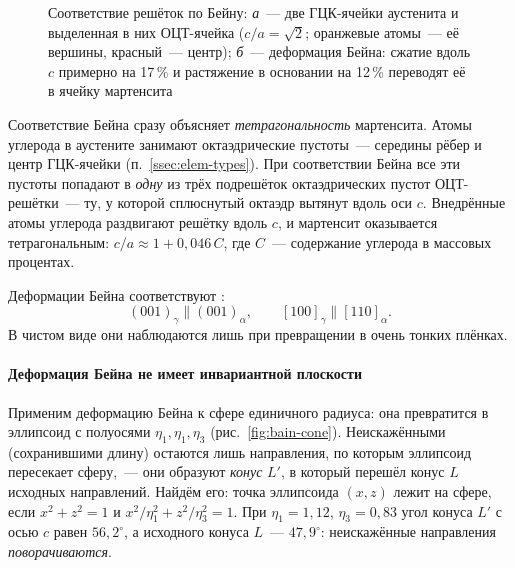 \begin{figure}[ht]
\caption{Соответствие решёток по Бейну: \textit{а}~— две ГЦК-ячейки
аустенита и выделенная в них ОЦТ-ячейка ($c/a=\sqrt2$; оранжевые атомы~—
её вершины, красный~— центр); \textit{б}~— деформация Бейна: сжатие вдоль
$c$ примерно на 17\,\% и растяжение в основании на 12\,\% переводят её в
ячейку мартенсита}
\label{fig:bain}
\end{figure}

Соответствие Бейна сразу объясняет \emph{тетрагональность} мартенсита.
Атомы углерода в аустените занимают октаэдрические пустоты~— середины
рёбер и центр ГЦК-ячейки (п.~\ref{ssec:elem-types}). При соответствии
Бейна все эти пустоты попадают в \emph{одну} из трёх подрешёток
октаэдрических пустот ОЦТ-решётки~— ту, у которой сплюснутый октаэдр
вытянут вдоль оси $c$. Внедрённые атомы углерода раздвигают решётку вдоль
$c$, и мартенсит оказывается тетрагональным:
$c/a\approx1+0{,}046\,C$, где $C$~— содержание углерода в массовых
процентах.

Деформации Бейна соответствуют :
\[
(001)_\gamma\parallel(001)_\alpha,\qquad [100]_\gamma\parallel[110]_\alpha .
\]
В чистом виде они наблюдаются лишь при превращении в очень тонких плёнках.

\paragraph{Деформация Бейна не имеет инвариантной плоскости}
Применим деформацию Бейна к сфере единичного радиуса: она превратится в
эллипсоид с полуосями $\eta_1,\eta_1,\eta_3$ (рис.~\ref{fig:bain-cone}).
Неискажёнными (сохранившими длину) остаются лишь направления, по которым
эллипсоид пересекает сферу,~— они образуют \emph{конус} $L'$, в который
перешёл конус $L$ исходных направлений. Найдём его: точка эллипсоида
$(x,z)$ лежит на сфере, если $x^2+z^2=1$ и
$x^2/\eta_1^2+z^2/\eta_3^2=1$. При $\eta_1=1{,}12$, $\eta_3=0{,}83$
угол конуса $L'$ с осью $c$ равен $56{,}2^\circ$, а исходного конуса $L$~—
$47{,}9^\circ$: неискажённые направления \emph{поворачиваются}.

